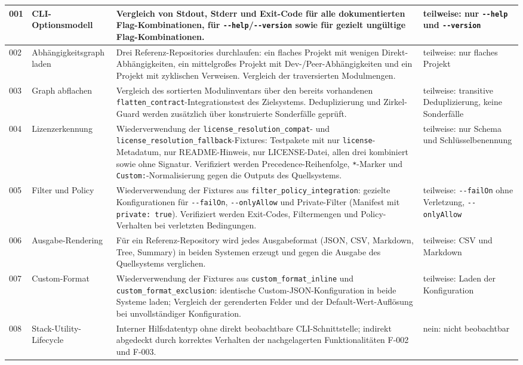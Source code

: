 \begin{small}
\begin{longtable}{|p{0.7cm}|p{2.6cm}|p{7.4cm}|p{3.4cm}|}
001 & CLI-Optionsmodell & Vergleich von Stdout, Stderr und Exit-Code für alle dokumentierten Flag-Kombinationen, für \texttt{-{}-help}/\texttt{-{}-version} sowie für gezielt ungültige Flag-Kombinationen. & teilweise: nur \texttt{-{}-help} und \texttt{-{}-version} \\
\hline
002 & Abhängigkeits\-graph laden & Drei Referenz-Repositories durchlaufen: ein flaches Projekt mit wenigen Direkt-Abhängigkeiten, ein mittelgroßes Projekt mit Dev-/Peer-Abhängigkeiten und ein Projekt mit zyklischen Verweisen. Vergleich der traversierten Modulmengen. & teilweise: nur flaches Projekt \\
\hline
003 & Graph abflachen & Vergleich des sortierten Modulinventars über den bereits vorhandenen \texttt{flatten\_contract}-Integrationstest des Zielsystems. Deduplizierung und Zirkel-Guard werden zusätzlich über konstruierte Sonderfälle geprüft. & teilweise: transitive Deduplizierung, keine Sonderfälle \\
\hline
004 & Lizenz\-erkennung & Wiederverwendung der \texttt{license\_resolution\_compat}- und \texttt{license\_resolution\_fallback}-Fixtures: Testpakete mit nur \texttt{license}-Metadatum, nur README-Hinweis, nur LICENSE-Datei, allen drei kombiniert sowie ohne Signatur. Verifiziert werden Precedence-Reihenfolge, \texttt{*}-Marker und \texttt{Custom:}-Normalisierung gegen die Outputs des Quellsystems. & teilweise: nur Schema und Schlüsselbenennung \\
\hline
005 & Filter und Policy & Wiederverwendung der Fixtures aus \texttt{filter\_policy\_integration}: gezielte Konfigurationen für \texttt{-{}-failOn}, \texttt{-{}-onlyAllow} und Private-Filter (Manifest mit \texttt{private: true}). Verifiziert werden Exit-Codes, Filtermengen und Policy-Verhalten bei verletzten Bedingungen. & teilweise: \texttt{-{}-failOn} ohne Verletzung, \texttt{-{}-onlyAllow} \\
\hline
006 & Ausgabe-Rendering & Für ein Referenz-Repository wird jedes Ausgabeformat (JSON, CSV, Markdown, Tree, Summary) in beiden Systemen erzeugt und gegen die Ausgabe des Quellsystems verglichen. & teilweise: CSV und Markdown \\
\hline
007 & Custom-Format & Wiederverwendung der Fixtures aus \texttt{custom\_format\_inline} und \texttt{custom\_format\_exclusion}: identische Custom-JSON-Konfiguration in beide Systeme laden; Vergleich der gerenderten Felder und der Default-Wert-Auflösung bei unvollständiger Konfiguration. & teilweise: Laden der Konfiguration \\
\hline
008 & Stack-Utility-Lifecycle & Interner Hilfsdatentyp ohne direkt beobachtbare CLI-Schnittstelle; indirekt abgedeckt durch korrektes Verhalten der nachgelagerten Funktionalitäten F-002 und F-003. & nein: nicht beobachtbar \\

\end{longtable}
\end{small}

